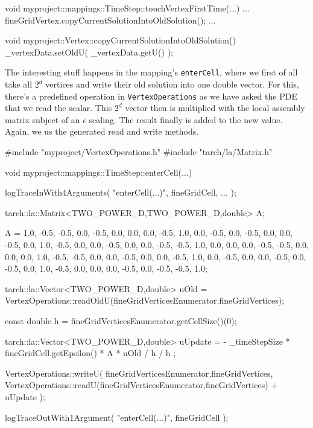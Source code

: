 \begin{code}
void myproject::mappings::TimeStep::touchVertexFirstTime(...) {
 ...  
 fineGridVertex.copyCurrentSolutionIntoOldSolution();
 ...  
}

void myproject::Vertex::copyCurrentSolutionIntoOldSolution() {
  _vertexData.setOldU( _vertexData.getU() );
}
\end{code}

\noindent
The interesting stuff happens in the mapping's \texttt{enterCell}, 
where we first of all take all $2^d$ vertices and write their old solution into
one double vector. 
For this, there's a predefined operation in \texttt{VertexOperations} as we have
asked the PDE that we read the scalar.
This $2^d$ vector then is multiplied with the local assembly matrix subject of
an $\epsilon$ scaling.
The result finally is added to the new value.
Again, we us the generated read and write methods.

\begin{code}
#include "myproject/VertexOperations.h"
#include "tarch/la/Matrix.h"

void myproject::mappings::TimeStep::enterCell(...) {
  logTraceInWith4Arguments( "enterCell(...)", fineGridCell, ... );

  tarch::la::Matrix<TWO_POWER_D,TWO_POWER_D,double> A;

  A =  1.0, -0.5, -0.5,  0.0, -0.5,  0.0,  0.0,  0.0,
      -0.5,  1.0,  0.0, -0.5,  0.0, -0.5,  0.0,  0.0,
      -0.5,  0.0,  1.0, -0.5,  0.0,  0.0, -0.5,  0.0,
       0.0, -0.5, -0.5,  1.0,  0.0,  0.0,  0.0, -0.5,
      -0.5,  0.0,  0.0,  0.0,  1.0, -0.5, -0.5,  0.0,
       0.0, -0.5,  0.0,  0.0, -0.5,  1.0,  0.0, -0.5,
       0.0,  0.0, -0.5,  0.0, -0.5,  0.0,  1.0, -0.5,
       0.0,  0.0,  0.0, -0.5,  0.0, -0.5, -0.5,  1.0;

  tarch::la::Vector<TWO_POWER_D,double> uOld = 
    VertexOperations::readOldU(fineGridVerticesEnumerator,fineGridVertices);

  const double h = fineGridVerticesEnumerator.getCellSize()(0);

  tarch::la::Vector<TWO_POWER_D,double> uUpdate = 
    - _timeStepSize * fineGridCell.getEpsilon() * A * uOld / h / h  ;

  VertexOperations::writeU(
    fineGridVerticesEnumerator,fineGridVertices,
    VertexOperations::readU(fineGridVerticesEnumerator,fineGridVertices) + uUpdate
  );

  logTraceOutWith1Argument( "enterCell(...)", fineGridCell );
}
\end{code}

